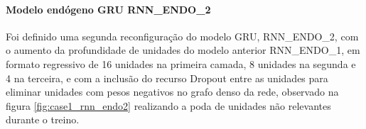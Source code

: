          \paragraph{Modelo endógeno GRU RNN\_ENDO\_2}
           Foi definido uma segunda reconfiguração do modelo GRU, RNN\_ENDO\_2, com o aumento da profundidade de unidades do modelo anterior RNN\_ENDO\_1, em formato regressivo de 16 unidades na primeira camada, 8 unidades na segunda e 4 na terceira, e com a inclusão do recurso Dropout entre as unidades para eliminar unidades com pesos negativos no grafo denso da rede, observado na figura \ref{fig:case1_rnn_endo2} realizando a poda de unidades não relevantes durante o treino.
            \begin{figure}[H]
            \end{figure}
